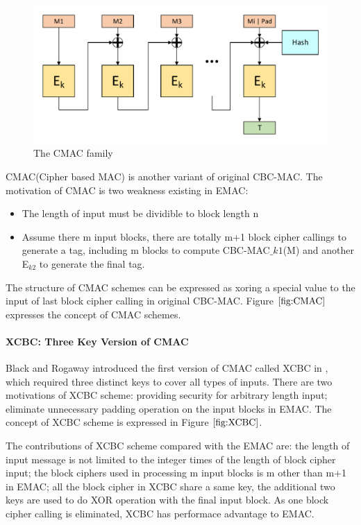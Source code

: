 \documentclass{article}
\begin{document}
\begin{figure}[htbp]
\centering
\includegraphics[scale=0.5]{./diagrams/cmac.pdf}
\caption{The CMAC family}
\label{fig:XCBC}
\end{figure}
CMAC(Cipher based MAC) is another variant of original CBC-MAC. The motivation of CMAC is two weakness existing in EMAC:
\begin{itemize}
	\item The length of input must be dividible to block length n
	\item Assume there m input blocks, there are totally m+1 block cipher callings to generate a tag, including m blocks to compute CBC-MAC$\_{k1}$(M) and another E$_{k2}$ to generate the final tag. 
\end{itemize}
The structure of CMAC schemes can be expressed as xoring a special value to the input of last block cipher calling in original CBC-MAC. Figure $\ref{fig:CMAC}$ expresses the concept of CMAC schemes.
	
\paragraph{XCBC: Three Key Version of CMAC}
Black and Rogaway introduced the first version of CMAC called XCBC in \cite{xcbc}, which required three distinct keys to cover all types of inputs.
There are two motivations of XCBC scheme: providing security for arbitrary length input; eliminate unnecessary padding operation on the input blocks in EMAC. The concept of XCBC scheme is expressed in Figure $\ref{fig:XCBC}$.

The contributions of XCBC scheme compared with the EMAC are: the length of input message is not limited to the integer times of the length of block cipher input; the block ciphers used in processing m input blocks is m other than m+1 in EMAC; all the block cipher in XCBC share a same key, the additional two keys are used to do XOR operation with the final input block. As one block cipher calling is eliminated, XCBC has performace advantage to EMAC.   
\end{document}
